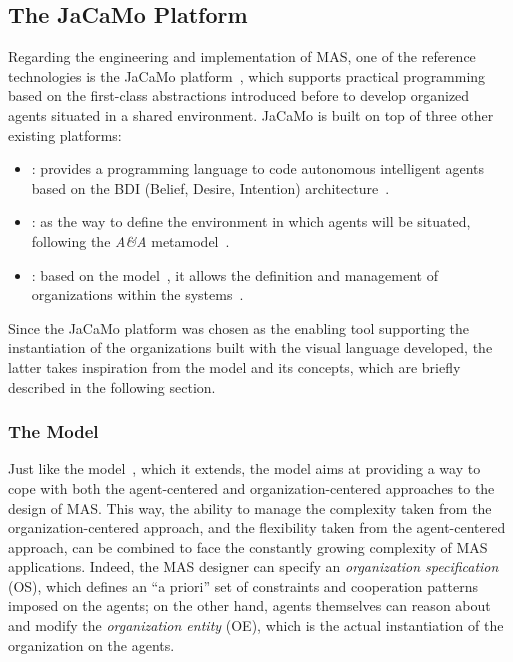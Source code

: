 \subsection{The JaCaMo Platform}
Regarding the engineering and implementation of MAS, one of the reference technologies is the JaCaMo platform~\cite{Boissier2016}, which supports practical programming based on the first-class abstractions introduced before to develop organized agents situated in a shared environment.
JaCaMo is built on top of three other existing platforms:
\begin{itemize}
    \item \jason{}: provides a programming language to code autonomous intelligent agents based on the BDI (Belief, Desire, Intention) architecture~\cite{bordini2007programming}\cite{Bratman1987-BRAIPA}.
    \item \cartago{}: as the way to define the environment in which agents will be situated, following the \textit{A\&A} metamodel~\cite{Ricci2009}.
    \item \moise{}: based on the \moiseplus{} model~\cite{10.1145/544741.544858}, it allows the definition and management of organizations within the systems~\cite{doi:10.1504/IJAOSE.2007.016266}.
\end{itemize}

Since the JaCaMo platform was chosen as the enabling tool supporting the instantiation of the organizations built with the visual language developed, the latter takes inspiration from the \moiseplus{} model and its concepts, which are briefly described in the following section.

\subsubsection{The \moiseplus{} Model}
Just like the \moise{} model~\cite{hannoun2000}, which it extends, the \moiseplus{} model aims at providing a way to cope with both the agent-centered and organization-centered approaches to the design of MAS.
This way, the ability to manage the complexity taken from the organization-centered approach, and the flexibility taken from the agent-centered approach, can be combined to face the constantly growing complexity of MAS applications.
Indeed, the MAS designer can specify an \textit{organization specification} (OS), which defines an ``a priori'' set of constraints and cooperation patterns imposed on the agents; on the other hand, agents themselves can reason about and modify the \textit{organization entity} (OE), which is the actual instantiation of the organization on the agents.

